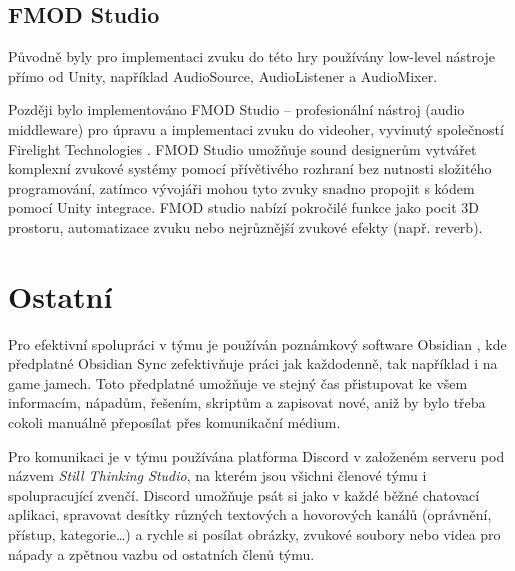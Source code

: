 \subsection{FMOD Studio}
\label{sec:fmod-studio}
Původně byly pro implementaci zvuku do této hry používány low-level nástroje přímo od Unity, například AudioSource, AudioListener a AudioMixer.

Později bylo implementováno FMOD Studio -- profesionální nástroj (audio middleware) pro úpravu a implementaci zvuku do videoher, vyvinutý společností Firelight Technologies \cite{fmod}. FMOD Studio umožňuje sound designerům vytvářet komplexní zvukové systémy pomocí přívětivého rozhraní bez nutnosti složitého programování, zatímco vývojáři mohou tyto zvuky snadno propojit s kódem pomocí Unity integrace. FMOD studio nabízí pokročilé funkce jako pocit 3D prostoru, automatizace zvuku nebo nejrůznější zvukové efekty (např. reverb).

\section{Ostatní}
Pro efektivní spolupráci v týmu je používán poznámkový software Obsidian \cite{obsidian}, kde předplatné Obsidian Sync zefektivňuje práci jak každodenně, tak například i na game jamech. Toto předplatné umožňuje ve stejný čas přistupovat ke všem informacím, nápadům, řešením, skriptům a zapisovat nové, aniž by bylo třeba cokoli manuálně přeposílat přes komunikační médium.

Pro komunikaci je v týmu používána platforma Discord \cite{discord} v založeném serveru pod názvem \emph{Still Thinking Studio}, na kterém jsou všichni členové týmu i spolupracující zvenčí. Discord umožňuje psát si jako v každé běžné chatovací aplikaci, spravovat desítky různých textových a hovorových kanálů (oprávnění, přístup, kategorie…) a rychle si posílat obrázky, zvukové soubory nebo videa pro nápady a zpětnou vazbu od ostatních členů týmu.